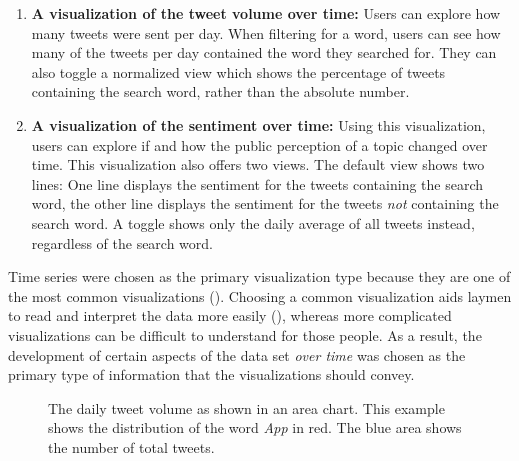 \begin{enumerate}
    \item \textbf{A visualization of the tweet volume over time:} Users can explore how many tweets were sent per day. When filtering for a word, users can see how many of the tweets per day contained the word they searched for. They can also toggle a normalized view which shows the percentage of tweets containing the search word, rather than the absolute number.
    \item \textbf{A visualization of the sentiment over time:} Using this visualization, users can explore if and how the public perception of a topic changed over time. This visualization also offers two views. The default view shows two lines: One line displays the sentiment for the tweets containing the search word, the other line displays the sentiment for the tweets \emph{not} containing the search word. A toggle shows only the daily average of all tweets instead, regardless of the search word.
\end{enumerate}

Time series were chosen as the primary visualization type because they are one of the most common visualizations (\cite{heerTourVisualizationZoo2010}). Choosing a common visualization aids laymen to read and interpret the data more easily (\cite{bornerInvestigatingAspectsData2016}), whereas more complicated visualizations can be difficult to understand for those people. As a result, the development of certain aspects of the data set \emph{over time} was chosen as the primary type of information that the visualizations should convey.

\begin{figure}[h!tb]
    \caption{The daily tweet volume as shown in an area chart. This example shows the distribution of the word \emph{App} in red. The blue area shows the number of total tweets.}
    \label{fig:volume_areachart}
\end{figure}

